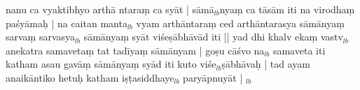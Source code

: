 \documentclass[article,12pt,a4paper]{memoir}%
\newcounter{parCount}
\begin{document}
	  
	  \pstart \leavevmode%
	nanu ca vyaktibhyo arthā \leavevmode{}ntaraṃ ca syāt | sāmā{\tiny $_{lb}$}nyaṃ ca tāsām iti na virodhaṃ paśyāmaḥ | na caitan manta{\tiny $_{lb}$}\leavevmode{} vyam arthāntaraṃ ced arthāntarasya sāmānyaṃ sarvaṃ sarvasya{\tiny $_{lb}$} \leavevmode{} sāmānyaṃ syāt viśeṣābhāvād iti || yad dhi khalv ekaṃ vastv{\tiny $_{lb}$} anekatra samavetaṃ tat tadīyaṃ sāmānyam | goṣu cāśvo na{\tiny $_{lb}$} samaveta iti katham asau gavāṃ sāmānyaṃ syād iti kuto viśe{\tiny $_{lb}$}ṣābhāvaḥ | tad ayam anaikāntiko hetuḥ katham iṣṭasiddhaye{\tiny $_{lb}$} paryāpnuyāt |
	{}
	\pend%
      {\tiny $_{lb}$}
\end{document}
